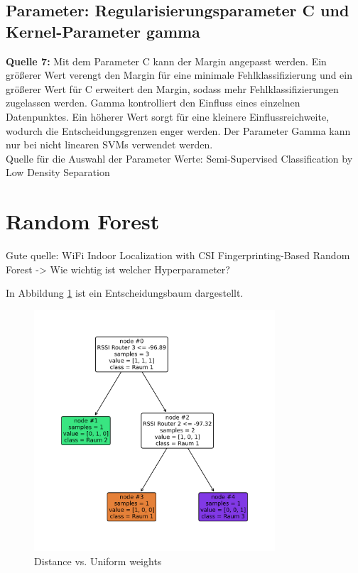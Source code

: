 \subsection{Parameter: Regularisierungsparameter C und Kernel-Parameter gamma}
\textbf{Quelle 7:} Mit dem Parameter C kann der Margin angepasst werden. Ein größerer Wert verengt den Margin für eine minimale Fehlklassifizierung und ein größerer Wert für C erweitert den Margin, sodass mehr Fehlklassifizierungen zugelassen werden. Gamma kontrolliert den Einfluss eines einzelnen Datenpunktes. Ein höherer Wert sorgt für eine kleinere Einflussreichweite, wodurch die Entscheidungsgrenzen enger werden. Der Parameter Gamma kann nur bei nicht linearen SVMs verwendet werden. \\
Quelle für die Auswahl der Parameter Werte: Semi-Supervised Classification by Low Density Separation

\section{Random Forest}

Gute quelle: WiFi Indoor Localization with CSI Fingerprinting-Based Random Forest -> Wie wichtig ist welcher Hyperparameter?

In Abbildung \ref{fig:myplot_7_rf} ist ein Entscheidungsbaum dargestellt.

\begin{figure}[H]
    \centering
    \includegraphics[width=0.8\textwidth]{images/myplot_7_rf.png}
    \caption{Distance vs. Uniform weights}
    \label{fig:myplot_7_rf}
\end{figure}

